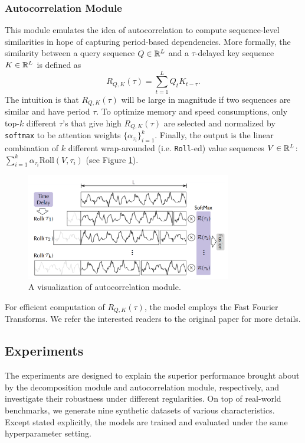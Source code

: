 \subsubsection{Autocorrelation Module}
This module emulates the idea of autocorrelation to compute sequence-level similarities in hope of capturing period-based dependencies. 
More formally, the similarity between a query sequence $Q \in \mathbb{R}^{L}$ and a $\tau$-delayed key sequence $K \in \mathbb{R}^{L}$ is defined as $$R_{Q, K}(\tau) = \sum_{t = 1}^L Q_tK_{t - \tau}.$$
The intuition is that $R_{Q, K}(\tau)$ will be large in magnitude if two sequences are similar and have period $\tau$. 
To optimize memory and speed consumptions, only top-$k$ different $\tau$'s that give high $R_{Q, K}(\tau)$ are selected and normalized by \texttt{softmax} to be attention weights $\{\alpha_{\tau_i}\}_{i = 1}^k$. 
Finally, the output is the linear combination of $k$ different wrap-arounded (i.e. \texttt{Roll}-ed) value sequences $V \in \mathbb{R}^{L}$: $\sum_{i = 1}^k \alpha_{\tau_i} \text{Roll}(V, \tau_i)$ (see Figure \ref{fig:autocorrelation}). 

\begin{figure}
    \centering
    \includegraphics[width=0.8\textwidth]{img/autocorrelation.png}
    \caption{A visualization of autocorrelation module.}
    \label{fig:autocorrelation}
\end{figure}

For efficient computation of $R_{Q, K}(\tau)$, the model employs the Fast Fourier Transforms. 
We refer the interested readers to the original paper for more details. 

\subsection{Experiments}
The experiments are designed to explain the superior performance brought about by the decomposition module and autocorrelation module, respectively, and investigate their robustness under different regularities. 
On top of real-world benchmarks, we generate nine synthetic datasets of various characteristics. 
Except stated explicitly, the models are trained and evaluated under the same hyperparameter setting. 

